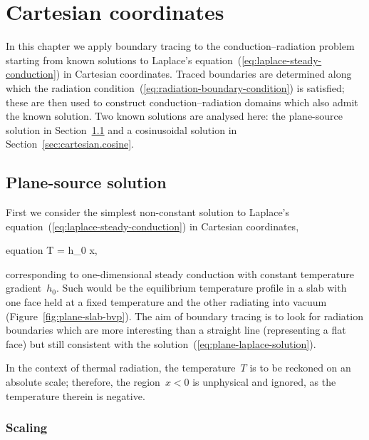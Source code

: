 \chapter{Cartesian coordinates}
\label{ch:cartesian}

In this chapter
we apply boundary tracing to the conduction--radiation problem
starting from known solutions
to Laplace's equation~(\ref{eq:laplace-steady-conduction})
in Cartesian coordinates.
Traced boundaries are determined along which
the radiation condition~(\ref{eq:radiation-boundary-condition})
is satisfied;
these are then used to construct conduction--radiation domains
which also admit the known solution.
Two known solutions are analysed here:
the plane-source solution in Section~\ref{sec:cartesian.plane}
and a cosinusoidal solution in Section~\ref{sec:cartesian.cosine}.

\section{Plane-source solution}
\label{sec:cartesian.plane}

First we consider the simplest non-constant solution
to Laplace's equation~(\ref{eq:laplace-steady-conduction})
in Cartesian coordinates,
\begin{important}{equation}
  T = h_0 x,
  \label{eq:plane-laplace-solution}
\end{important}
corresponding to one-dimensional steady conduction
with constant temperature gradient~$h_0$.
Such would be the equilibrium temperature profile in a slab
with one face held at a fixed temperature
and the other radiating into vacuum
(Figure~\ref{fig:plane-slab-bvp}).
The aim of boundary tracing is to look for radiation boundaries
which are more interesting than a straight line (representing a flat face)
but still consistent with the solution~(\ref{eq:plane-laplace-solution}).

\begin{figure}
\end{figure}

In the context of thermal radiation,
the temperature~$T$ is to be reckoned on an absolute scale;
therefore, the region~$x < 0$ is unphysical and ignored,
as the temperature therein is negative.

\subsection{Scaling}
\label{sec:cartesian.plane.scaling}

